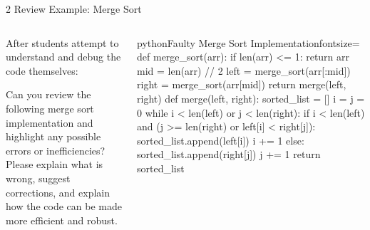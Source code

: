\documentclass[xcolor={dvipsnames,table}, aspectratio=169]{beamer}
\begin{document}
\begin{frame}[fragile]{2 Review Example: Merge Sort}
  \begin{columns}[T]
    \begin{column}{0.42\textwidth}
      After students attempt to understand and debug the code themselves:
      \begin{promptbox}
Can you review the following merge sort implementation and highlight any possible errors or inefficiencies? Please explain what is wrong, suggest corrections, and explain how the code can be made more efficient and robust.
      \end{promptbox}
    \end{column}
    
    \begin{column}{0.52\textwidth}
      \vspace{-1.5em}
      \begin{codeboxtc}{python}{Faulty Merge Sort Implementation}{}{fontsize=\scriptsize}
    def merge_sort(arr):
        if len(arr) <= 1:
            return arr
        mid = len(arr) // 2
        left = merge_sort(arr[:mid])
        right = merge_sort(arr[mid]) 
        return merge(left, right)
    def merge(left, right):
        sorted_list = []
        i = j = 0
        while i < len(left) or j < len(right):          
            if i < len(left) and (j >= len(right) or left[i] < right[j]):
                sorted_list.append(left[i])
                i += 1
            else:
                sorted_list.append(right[j])
                j += 1
        return sorted_list\end{codeboxtc}
    \end{column}
  \end{columns}
\end{frame}
\end{document}
